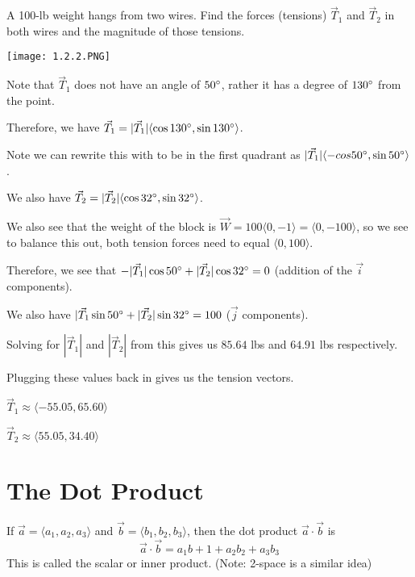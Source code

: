 \documentclass[../calc3.tex]{subfiles}
\begin{document}
\begin{example}
    A 100-lb weight hangs from two wires. Find the forces (tensions) $\vec{T}_1$ and $\vec{T}_2$ in both wires and the magnitude of those tensions.
    \begin{center}
        \texttt{[image: 1.2.2.PNG]}
    \end{center}

    Note that $\vec{T}_1$ does not have an angle of $50\degree$, rather it has a degree of $130\degree$ from the point.

    Therefore, we have $\vec{T}_1=|\vec{T}_1|\langle \cos 130\degree, \sin 130\degree\rangle$.

    Note we can rewrite this with to be in the first quadrant as $|\vec{T}_1|\langle -cos 50\degree, \sin 50\degree\rangle$.

    We also have $\vec{T}_2=|\vec{T}_2|\langle \cos 32\degree, \sin 32\degree\rangle$.

    We also see that the weight of the block is $\vec{W}=100\langle 0,-1\rangle = \langle 0,-100\rangle$, so we see to balance this out, both tension forces need to equal $\langle 0,100\rangle$.

    Therefore, we see that $-|\vec{T}_1|\cos 50\degree + |\vec{T}_2|\cos 32\degree = 0$ (addition of the $\vec{i}$ components).

    We also have $|\vec{T}_1\sin 50\degree + |\vec{T}_2|\sin 32\degree = 100$ ($\vec{j}$ components).

    Solving for $|\vec{T}_1|$ and $|\vec{T}_2|$ from this gives us $85.64$ lbs and $64.91$ lbs respectively.

    Plugging these values back in gives us the tension vectors. 

    $\vec{T}_1 \approx \langle -55.05, 65.60\rangle$

    $\vec{T}_2 \approx \langle 55.05, 34.40 \rangle$
\end{example}

\section{The Dot Product}
\begin{definition}
    If $\vec{a}=\langle a_1,a_2,a_3\rangle$ and $\vec{b}=\langle b_1,b_2,b_3\rangle$, then the dot product $\vec{a}\cdot \vec{b}$ is 
    \[ \vec{a}\cdot \vec{b} = a_1b+1+a_2b_2+a_3b_3 \]
    This is called the scalar or inner product. (Note: 2-space is a similar idea)
\end{definition}
\end{document}
